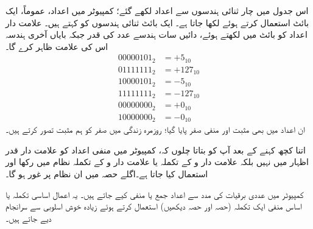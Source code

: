 اس جدول میں چار ثنائی ہندسوں سے اعداد لکھے گئے؛ کمپیوٹر میں اعداد، عموماً، ایک بائٹ استعمال کرتے ہوئے لکھا جاتا ہے۔ ایک بائٹ  ثنائی ہندسوں کو کہتے ہیں۔ علامت دار اعداد کو بائٹ میں لکھتے ہوئے، دائیں سات ہندسے عدد کی قدر جبکہ بایاں آخری ہندسہ اس کی علامت ظاہر کرے گا۔
\begin{align*}
00000101_2&=+5_{10}\\
01111111_2&=+127_{10}\\
10000101_2&=-5_{10}\\
11111111_2&=-127_{10}\\
00000000_2&=+0_{10}\\
10000000_2&=-0_{10}
\end{align*}
ان اعداد میں بھی مثبت اور منفی صفر پایا گیا؛ روزمرہ زندگی میں صفر کو ہم مثبت تصور کرتے ہیں۔

اتنا کچھ کہنے کے بعد آپ کو بتاتا چلوں کہ، کمپیوٹر میں منفی اعداد کو  علامت دار قدر اظہار میں نہیں بلکہ علامت دار و  کے تکملہ یا علامت دار و  کے تکملہ نظام میں رکھا اور استعمال کیا جاتا ہے۔اگلے حصہ میں ان نظام پر غور ہو گا۔

کمپیوٹر میں عددی برقیات کی مدد سے اعداد جمع یا منفی کیے جاتے ہیں۔ یہ اعمال اساسی تکملہ یا اساس منفی ایک  تکملہ (حصہ  اور حصہ  دیکھیں) استعمال کرتے ہوئے زیادہ خوش اسلوبی سے سرانجام دیے جاتے ہیں۔

